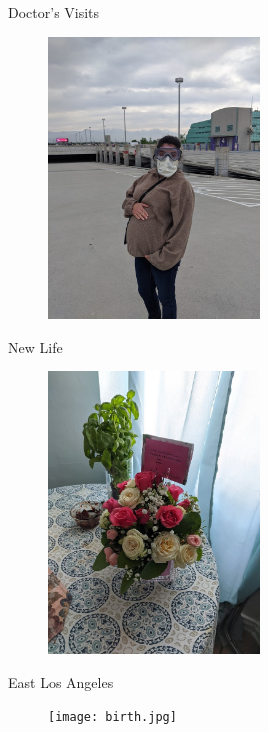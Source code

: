 \documentclass{beamer}
\begin{document}
\begin{frame}{Doctor's Visits}
\begin{figure}
\includegraphics[width=0.5\textwidth]{priscilla1.jpg}
\end{figure}
\end{frame}

\begin{frame}{New Life}
\begin{figure}
\includegraphics[width=0.5\textwidth]{flowers.jpg}
\end{figure}
\end{frame}

\begin{frame}{East Los Angeles}
\begin{figure}
\texttt{[image: birth.jpg]}
\end{figure}
\end{frame}
\end{document}
